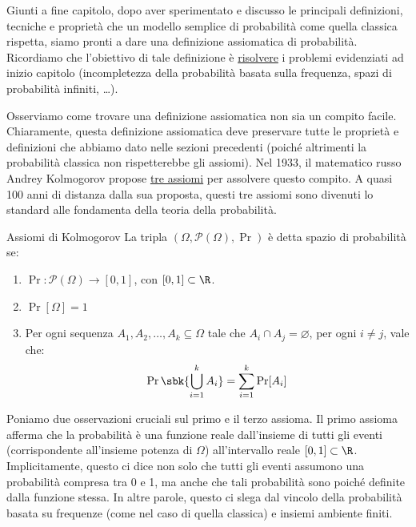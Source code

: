 \documentclass[a4paper, 12pt]{report}
\begin{document}
    Giunti a fine capitolo, dopo aver sperimentato e discusso le principali definizioni, tecniche e proprietà che un modello semplice di probabilità  come quella classica rispetta, siamo pronti a dare una definizione assiomatica di probabilità. Ricordiamo che l'obiettivo di tale definizione è \underline{risolvere} i problemi evidenziati ad inizio capitolo (incompletezza della probabilità basata sulla frequenza, spazi di probabilità infiniti, \dots).
    
    Osserviamo come trovare una definizione assiomatica non sia un compito facile. Chiaramente, questa definizione assiomatica deve preservare tutte le proprietà e definizioni che abbiamo dato nelle sezioni precedenti (poiché altrimenti la probabilità classica non rispetterebbe gli assiomi). Nel 1933, il matematico russo Andrey Kolmogorov propose \underline{tre assiomi} per assolvere questo compito. A quasi 100 anni di distanza dalla sua proposta, questi tre assiomi sono divenuti lo standard alle fondamenta della teoria della probabilità.

    \begin{frameddefn}{Assiomi di Kolmogorov}
        La tripla $(\Omega, \mathcal{P}(\Omega), \Pr)$ è detta spazio di probabilità se:
        \begin{enumerate}
            \item $\Pr : \mathcal{P}(\Omega) \to [0,1]$, con $[0,1] \subset \R$.
            \item $\Pr[\Omega] = 1$
            \item Per ogni sequenza $A_1, A_2, \ldots, A_k \subseteq \Omega$ tale che $A_i \cap A_j = \varnothing$, per ogni $i \neq j$, vale che:
            \[\Pr\sbk{\bigcup_{i = 1}^k A_i} = \sum_{i = 1}^k \Pr[A_i]\]
        \end{enumerate}
    \end{frameddefn}

    Poniamo due osservazioni cruciali sul primo e il terzo assioma. Il primo assioma afferma che la probabilità è una funzione reale dall'insieme di tutti gli eventi (corrispondente all'insieme potenza di $\Omega$) all'intervallo reale $[0,1] \subset \R$. Implicitamente, questo ci dice non solo che tutti gli eventi assumono una probabilità compresa tra 0 e 1, ma anche che tali probabilità sono  poiché definite dalla funzione stessa. In altre parole, questo ci slega dal vincolo della probabilità basata su frequenze (come nel caso di quella classica) e insiemi ambiente finiti.
        
\end{document}
